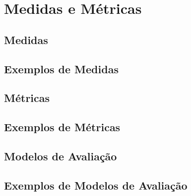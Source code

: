 \section{Medidas e Métricas}
\subsection{Medidas}
\subsection{Exemplos de Medidas}
\subsection{Métricas}
\subsection{Exemplos de Métricas}
\subsection{Modelos de Avaliação}
\subsection{Exemplos de Modelos de Avaliação}
